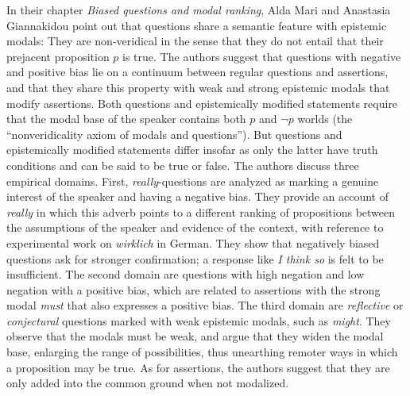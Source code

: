 \documentclass[output=paper,colorlinks,citecolor=brown]{langscibook}
\begin{document}
In their chapter \textit{Biased questions and modal ranking}, Alda Mari and Anastasia Giannakidou point out that questions share a semantic feature with epistemic modals: They are non-veridical in the sense that they do not entail that their prejacent proposition $p$ is true. The authors suggest that questions with negative and positive bias lie on a continuum between regular questions and assertions, and that they share this property with weak and strong epistemic modals that modify assertions. Both questions and epistemically modified statements require that the modal base of the speaker contains both $p$ and $\neg p$ worlds (the ``nonveridicality axiom of modals and questions''). But questions and epistemically modified statements differ insofar as only the latter have truth conditions and can be said to be true or false. The authors discuss three empirical domains. First, \textit{really}-questions are analyzed as marking a genuine interest of the speaker and having a negative bias. They provide an account of \textit{really} in which this adverb points to a different ranking of propositions between the assumptions of the speaker and evidence of the context, with reference to experimental work on \textit{wirklich} in German. They show that negatively biased questions ask for stronger confirmation; a response like \textit{I think so} is felt to be insufficient. The second domain are questions with high negation and low negation with a positive bias, which are related to assertions with the strong modal \textit{must} that also expresses a positive bias. The third domain are \textit{reflective} or \textit{conjectural} questions marked with weak epistemic modals, such as \textit{might}. They observe that the modals must be weak, and argue that they widen the modal base, enlarging the range of possibilities, thus unearthing remoter ways in which a proposition may be true. As for assertions, the authors suggest that they are only added into the common ground when not modalized.    
\end{document}
